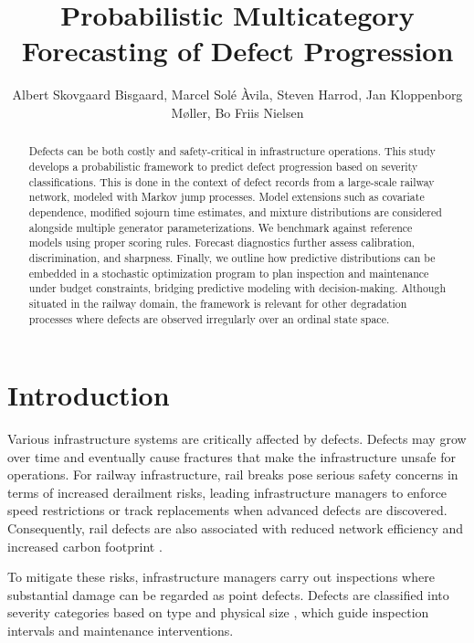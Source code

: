 \documentclass{article}
\title{Probabilistic Multicategory Forecasting of Defect Progression}
\author{Albert Skovgaard Bisgaard, Marcel Solé Àvila, Steven Harrod, Jan Kloppenborg Møller, Bo Friis Nielsen}
\date{}
\begin{document}
\maketitle



\begin{abstract}
Defects can be both costly and safety-critical in infrastructure operations. 
This study develops a probabilistic framework to predict defect progression based on severity classifications.
This is done in the context of defect records from a large-scale railway network, modeled with Markov jump processes.
Model extensions such as covariate dependence, modified sojourn time estimates, and mixture distributions are considered alongside multiple generator parameterizations.
We benchmark against reference models using proper scoring rules. Forecast diagnostics further assess calibration, discrimination, and sharpness. 
Finally, we outline how predictive distributions can be embedded in a stochastic optimization program to plan inspection and maintenance under budget constraints, bridging predictive modeling with decision-making.
Although situated in the railway domain, the framework is relevant for other degradation processes where defects are observed irregularly over an ordinal state space.
\end{abstract} 




\section{Introduction} \label{sec:introduction} Various infrastructure systems are critically affected by defects. Defects may grow over time and eventually cause fractures that make the infrastructure unsafe for operations.
For railway infrastructure, rail breaks pose serious safety concerns in terms of increased derailment risks, leading infrastructure managers to enforce speed restrictions or track replacements when advanced defects are discovered. 
Consequently, rail defects are also associated with reduced network efficiency and increased carbon footprint \citep{cannon2003a,Zoeteman2014DutchBeyond}.  

To mitigate these risks, infrastructure managers carry out inspections where substantial damage can be regarded as point defects. 
Defects are classified into severity categories based on type and physical size \citep{UIC_2002_defecthandbook}, which guide inspection intervals and maintenance interventions.  
\end{document}
